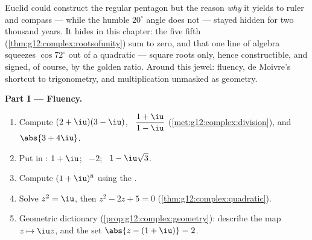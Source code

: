 \begin{problem}
\label{pb:g12:complex:1}
Euclid could construct the regular pentagon but the reason
\emph{why} it yields to ruler and compass --- while the humble
$20^\circ$ angle does not --- stayed hidden for two thousand
years. It hides in this chapter: the five fifth 
(\cref{thm:g12:complex:rootsofunity}) sum to zero, and that one
line of algebra squeezes $\cos 72^\circ$ out of a quadratic
 --- square roots only, hence constructible, and signed,
of course, by the golden ratio. Around this jewel: fluency, de
Moivre's shortcut to trigonometry, and multiplication unmasked as
geometry.

\medskip
\noindent\textbf{Part I --- Fluency.}
\begin{enumerate}
  \item Compute $(2 + \iu)(3 - \iu)$, \
        $\dfrac{1 + \iu}{1 - \iu}$
        (\cref{met:g12:complex:division}), and
        $\abs{3 + 4\iu}$.
  \item Put in : $1 + \iu$; \ $-2$; \
        $1 - \iu\sqrt3$.
  \item Compute $(1 + \iu)^8$ using the .
  \item Solve $z^2 = \iu$, then $z^2 - 2z + 5 = 0$
        (\cref{thm:g12:complex:quadratic}).
  \item Geometric dictionary
        (\cref{prop:g12:complex:geometry}): describe the map
        $z \mapsto \iu z$, and the set
        $\abs{z - (1 + \iu)} = 2$.
\end{enumerate}


\end{problem}
